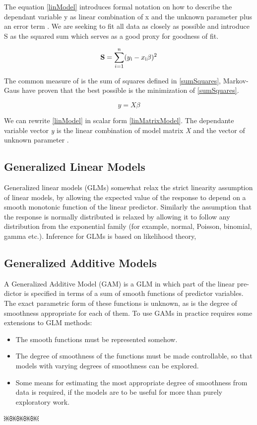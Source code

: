 \documentclass{article}
\begin{document}
    The equation \ref{linModel} introduces formal notation on how to describe the dependant variable y as linear combination of x and the unknown parameter \textbeta plus an error term \textepsilon. We are seeking \textbeta to fit all data as closely as possible and introduce S as the squared sum which serves as a good proxy for goodness of fit.

    \begin{equation} \label{sumSquares} \mathbf{S} =  \sum_{i=1}^{n}(y\textsubscript{i} - x\textsubscript{i}\beta)^{2} \end{equation}

    The common measure of \textbeta is the sum of squares defined in \ref{sumSquares}, Markov-Gaus have proven that the best possible \textbeta is the minimization of \ref{sumSquares}.

    \begin{equation}  \label{linMatrixModel} y =  X \beta \end{equation}

    We can rewrite \ref{linModel} in scalar form \ref{linMatrixModel}. The dependante variable vector \textit{y} is the linear combination of model matrix \textit{X} and the vector of unknown parameter \textbeta.

    \subsection{Generalized Linear Models}
    Generalized linear models (GLMs) somewhat relax the strict linearity assumption of linear models, by allowing the expected value of the response to depend on a smooth monotonic function of the linear predictor. Similarly the assumption that the response is normally distributed is relaxed by allowing it to follow any distribution from the exponential family (for example, normal, Poisson, binomial, gamma etc.). Inference for GLMs is based on likelihood theory,

    \subsection{Generalized Additive Models}
    A Generalized Additive Model (GAM) is a GLM in which part of the linear pre- dictor is specified in terms of a sum of smooth functions of predictor variables. The exact parametric form of these functions is unknown, as is the degree of smoothness appropriate for each of them. To use GAMs in practice requires some extensions to GLM methods:
    \begin{itemize}
        \item The smooth functions must be represented somehow.
        \item The degree of smoothness of the functions must be made controllable, so that models with varying degrees of smoothness can be explored.
        \item Some means for estimating the most appropriate degree of smoothness from data is required, if the models are to be useful for more than purely exploratory work.
    \end{itemize}
￼￼￼￼￼
\end{document}
